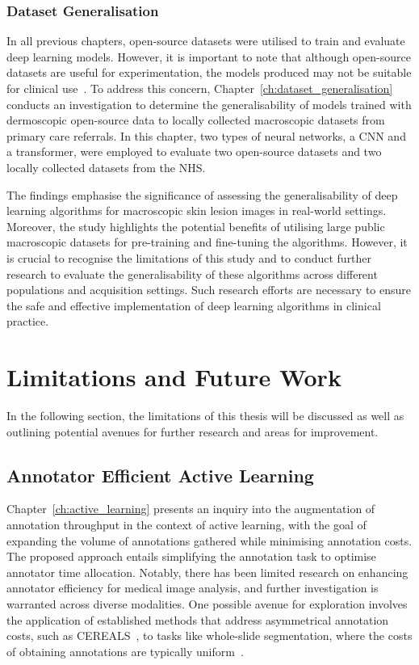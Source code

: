 \subsubsection{Dataset Generalisation}
In all previous chapters, open-source datasets were utilised to train and evaluate deep learning models. However, it is important to note that although open-source datasets are useful for experimentation, the models produced may not be suitable for clinical use~\citep{wu2022skin}. To address this concern, Chapter~\ref{ch:dataset_generalisation} conducts an investigation to determine the generalisability of models trained with dermoscopic open-source data to locally collected macroscopic datasets from primary care referrals. In this chapter, two types of neural networks, a CNN and a transformer, were employed to evaluate two open-source datasets and two locally collected datasets from the NHS. 

The findings emphasise the significance of assessing the generalisability of deep learning algorithms for macroscopic skin lesion images in real-world settings. Moreover, the study highlights the potential benefits of utilising large public macroscopic datasets for pre-training and fine-tuning the algorithms. However, it is crucial to recognise the limitations of this study and to conduct further research to evaluate the generalisability of these algorithms across different populations and acquisition settings. Such research efforts are necessary to ensure the safe and effective implementation of deep learning algorithms in clinical practice.



\section{Limitations and Future Work}
In the following section, the limitations of this thesis will be discussed as well as outlining potential avenues for further research and areas for improvement.

\subsection{Annotator Efficient Active Learning}
Chapter~\ref{ch:active_learning} presents an inquiry into the augmentation of annotation throughput in the context of active learning, with the goal of expanding the volume of annotations gathered while minimising annotation costs. The proposed approach entails simplifying the annotation task to optimise annotator time allocation. Notably, there has been limited research on enhancing annotator efficiency for medical image analysis, and further investigation is warranted across diverse modalities. One possible avenue for exploration involves the application of established methods that address asymmetrical annotation costs, such as CEREALS~\citep{mackowiak2018cereals}, to tasks like whole-slide segmentation, where the costs of obtaining annotations are typically uniform~\citep{budd2021survey}.

